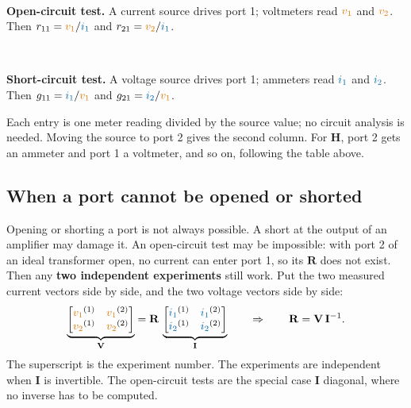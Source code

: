 \documentclass[11pt,a4paper]{article}
\newcommand{\Icol}[1]{\textcolor{ccur}{#1}}
\newcommand{\Vcol}[1]{\textcolor{cvolt}{#1}}
\newcommand{\vone}{\Vcol{v_1}}  \newcommand{\vtwo}{\Vcol{v_2}}
\newcommand{\ione}{\Icol{i_1}}  \newcommand{\itwo}{\Icol{i_2}}
\newcommand{\Rm}{\mathbf{R}}  \newcommand{\Gm}{\mathbf{G}}
\newcommand{\Hm}{\mathbf{H}}  \newcommand{\Tm}{\mathbf{T}}
\newcommand{\vmeter}[5]{%
  \draw (#1,#2) -- (#1,{(#2+#3)/2+0.32}); \draw (#1,{(#2+#3)/2-0.32}) -- (#1,#3);
  \node[circle, draw, thick, minimum size=0.64cm, inner sep=0pt, font=\small\bfseries] at (#1,{(#2+#3)/2}) {#4};
  \node[anchor=west, font=\small] at ({#1+0.38},{(#2+#3)/2}) {#5};}
\newcommand{\hmeter}[5]{%
  \draw (#1,#3) -- ({(#1+#2)/2-0.32},#3); \draw ({(#1+#2)/2+0.32},#3) -- (#2,#3);
  \node[circle, draw, thick, minimum size=0.64cm, inner sep=0pt, font=\small\bfseries] at ({(#1+#2)/2},#3) {#4};
  \node[anchor=south, font=\small] at ({(#1+#2)/2},{#3+0.36}) {#5};}
\newcommand{\bench}[1]{%
  \draw[thick, fill=gray!8] (3.0,-0.2) rectangle (5.0,2.4);
  \node[font=\large] at (4.0,1.1) {$N$};
  \draw (3.0,2.0) -- (2.6,2.0); \draw (3.0,0.2) -- (2.6,0.2);
  \draw (5.0,2.0) -- (5.4,2.0); \draw (5.0,0.2) -- (5.4,0.2);
  \foreach \p in {(2.6,2.0),(2.6,0.2),(5.4,2.0),(5.4,0.2)} \draw \p node[ocirc] {};
  \ifcase#1
    \draw (0,0.2) to[american current source, l=$\Icol{i_1}$] (0,2.0) -- (2.6,2.0);
    \draw (0,0.2) -- (2.6,0.2);
    \vmeter{1.5}{2.0}{0.2}{V}{$\Vcol{v_1}$}
    \fill (1.5,2.0) circle (1.6pt); \fill (1.5,0.2) circle (1.6pt);
    \draw (5.4,2.0) -- (6.6,2.0); \draw (5.4,0.2) -- (6.6,0.2);
    \vmeter{6.6}{2.0}{0.2}{V}{$\Vcol{v_2}$}
    \node[font=\small, text=ccur, anchor=south] at (6.0,2.05) {$i_2 = 0$};
  \or
    \draw (0,2.0) to[american voltage source, l_=$\Vcol{v_1}$] (0,0.2);
    \hmeter{0}{2.6}{2.0}{A}{$\Icol{i_1}$}
    \draw (0,0.2) -- (2.6,0.2);
    \draw (5.4,2.0) -- (6.6,2.0); \draw (5.4,0.2) -- (6.6,0.2);
    \vmeter{6.6}{2.0}{0.2}{A}{$\Icol{i_2}$}
    \node[font=\small, text=cvolt, anchor=south] at (6.0,2.05) {$v_2 = 0$};
  \fi}
\begin{document}
\medskip
\noindent
\begin{minipage}[t]{0.49\linewidth}
\centering
{}\\[2pt]
{\small\raggedright \textbf{Open-circuit test.} A current source drives port 1; voltmeters read
$\vone$ and $\vtwo$. Then $r_{11} = \vone/\ione$ and $r_{21} = \vtwo/\ione$.}
\end{minipage}\hfill
\begin{minipage}[t]{0.49\linewidth}
\centering
{}\\[2pt]
{\small\raggedright \textbf{Short-circuit test.} A voltage source drives port 1; ammeters read
$\ione$ and $\itwo$. Then $g_{11} = \ione/\vone$ and $g_{21} = \itwo/\vone$.}
\end{minipage}

\medskip
Each entry is one meter reading divided by the source value; no circuit analysis is needed.
Moving the source to port 2 gives the second column. For $\Hm$, port 2 gets an ammeter and port
1 a voltmeter, and so on, following the table above.

\subsection{When a port cannot be opened or shorted}

Opening or shorting a port is not always possible. A short at the output of an amplifier may
damage it. An open-circuit test may be impossible: with port 2 of an ideal transformer open,
no current can enter port 1, so its $\Rm$ does not exist. Then any \textbf{two independent experiments} still work. Put the two
measured current vectors side by side, and the two voltage vectors side by side:
\[
  \underbrace{\begin{bmatrix} \vone^{(1)} & \vone^{(2)}\\ \vtwo^{(1)} & \vtwo^{(2)} \end{bmatrix}}_{\mathbf{V}}
  = \Rm\,
  \underbrace{\begin{bmatrix} \ione^{(1)} & \ione^{(2)}\\ \itwo^{(1)} & \itwo^{(2)} \end{bmatrix}}_{\mathbf{I}}
  \qquad\Rightarrow\qquad
  \Rm = \mathbf{V}\,\mathbf{I}^{-1} .
\]
The superscript is the experiment number. The experiments are independent when $\mathbf{I}$ is
invertible. The open-circuit tests are the special case $\mathbf{I}$ diagonal, where no inverse
has to be computed.
\end{document}
